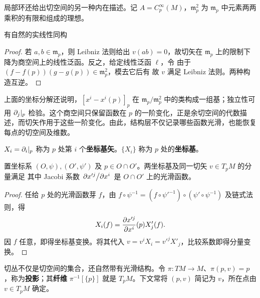 局部环还给出切空间的另一种内在描述。记 $A=C^\infty_p(M)$，$\mathfrak m_p^2$ 为 $\mathfrak m_p$ 中元素两两乘积的有限和组成的理想。
\begin{proposition}\label{prop:tangent-local-ring}
    有自然的实线性同构
\end{proposition}
\begin{proof}
    若 $a,b\in\mathfrak m_p$，则 Leibniz 法则给出 $v(ab)=0$，故切矢在 $\mathfrak m_p$ 上的限制下降为商空间上的线性泛函。反之，给定线性泛函 $\ell$，令
    由于 $(f-f(p))(g-g(p))\in\mathfrak m_p^2$，模去它后有
    故 $v$ 满足 Leibniz 法则。两种构造互逆。
\end{proof}

上面的坐标分解还说明，$[x^i-x^i(p)]_p$ 在 $\mathfrak m_p/\mathfrak m_p^2$ 中的类构成一组基；独立性可用 $\partial_j|_p$ 检验。这个商空间只保留函数在 $p$ 的一阶变化，正是余切空间的代数描述，而切矢作用于这些一阶变化。由此，结构层不仅记录哪些函数光滑，也能恢复每点的切空间及维数。

\begin{definition}
    $X_i = \partial_i|_p$ 称为 $p$ 处第 $i$ 个\textbf{坐标基矢}。$\{X_i\}$ 称为 $p$ 处的\textbf{坐标基}。
\end{definition}

\begin{theorem}[坐标分量变换律]
    置坐标系 $(O,\psi),(O',\psi')$ 及 $p\in O\cap O'$。两坐标基及同一切矢 $v\in T_pM$ 的分量满足
    其中 Jacobi 系数 $\pdv*{x'^j}{x^i}$ 是 $O\cap O'$ 上的光滑函数。
\end{theorem}
\begin{proof}
    任给 $p$ 处的光滑函数芽 $f$，由 $f\circ\psi^{-1}=(f\circ\psi'^{-1})\circ(\psi'\circ\psi^{-1})$ 及链式法则，得
    \[
        X_i(f)= {\pdv{x'^j}{x^i}}(p)X'_j(f).
    \]
    因 $f$ 任意，即得坐标基变换。将其代入 $v= v^iX_i= v'^jX'_j$，比较系数即得分量变换。
\end{proof}

切丛不仅是切空间的集合，还自然带有光滑结构。令 $\pi:TM\to M$、$\pi(p,v)=p$，称为\textbf{投影}；其\textbf{纤维} $\pi^{-1}[\{p\}]$ 就是 $T_pM$。下文常将 $(p,v)$ 简记为 $v$，所在点由 $v\in T_pM$ 确定。

